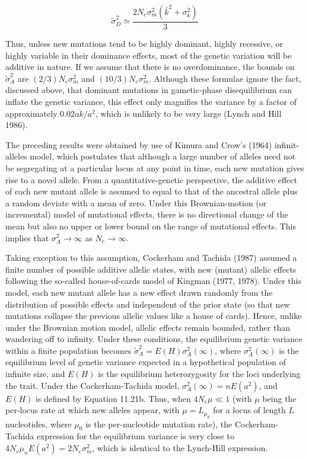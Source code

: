 \documentclass{article}
\begin{document}
\begin{equation}
\widetilde{\sigma}_{D}^{2}\simeq\frac{2N_{e}\sigma_{m}^{2}(\bar{k}^{2}+\sigma_{k}^{2})}{3}
\tag{11.22b}
\label{eq:11_22b}
\end{equation}

Thus, unless new mutations tend to be highly dominant, highly recessive, or highly variable in their dominance effects, most of the genetic variation will be additive in nature. If we assume that there is no overdominance, the bounds on  $ \widetilde{\sigma}_A^2 $ are  $ (2/3)N_e\sigma_m^2 $ and  $ (10/3)N_e\sigma_m^2 $. Although these formulae ignore the fact, discussed above, that dominant mutations in gametic-phase disequilibrium can inflate the genetic variance, this effect only magnifies the variance by a factor of approximately  $ 0.02\overline{ak}/a^2 $, which is unlikely to be very large (Lynch and Hill 1986).

The preceding results were obtained by use of Kimura and Crow's (1964) infinit-alleles model, which postulates that although a large number of alleles need not be segregating at a particular locus at any point in time, each new mutation gives rise to a novel allele. From a quantitative-genetic perspective, the additive effect of each new mutant allele is assumed to equal to that of the ancestral allele plus a random deviate with a mean of zero. Under this Brownian-motion (or incremental) model of mutational effects, there is no directional change of the mean but also no upper or lower bound on the range of mutational effects. This implies that  $ \sigma_A^2 \to \infty $ as  $ N_e \to \infty $.

Taking exception to this assumption, Cockerham and Tachida (1987) assumed a finite number of possible additive allelic states, with new (mutant) allelic effects following the so-called house-of-cards model of Kingman (1977, 1978). Under this model, each new mutant allele has a new effect drawn randomly from the distribution of possible effects and independent of the prior state (so that new mutations collapse the previous allelic values like a house of cards). Hence, unlike under the Brownian motion model, allelic effects remain bounded, rather than wandering off to infinity. Under these conditions, the equilibrium genetic variance within a finite population becomes  $ \widetilde{\sigma}_A^2 = E(H)\sigma_A^2(\infty) $, where  $ \sigma_A^2(\infty) $ is the equilibrium level of genetic variance expected in a hypothetical population of infinite size, and  $ E(H) $ is the equilibrium heterozygosity for the loci underlying the trait. Under the Cockerham-Tachida model,  $ \sigma_A^2(\infty) = nE(a^2) $, and  $ E(H) $ is defined by Equation 11.21b. Thus, when  $ 4N_e\mu \ll 1 $ (with  $ \mu $ being the per-locus rate at which new alleles appear, with  $ \mu = L_{\mu_0} $ for a locus of length  $ L $ nucleotides, where  $ \mu_0 $ is the per-nucleotide mutation rate), the Cockerham-Tachida expression for the equilibrium variance is very close to  $ 4N_e\mu_nE(a^2) = 2N_e\sigma_m^2 $, which is identical to the Lynch-Hill expression.
\end{document}
